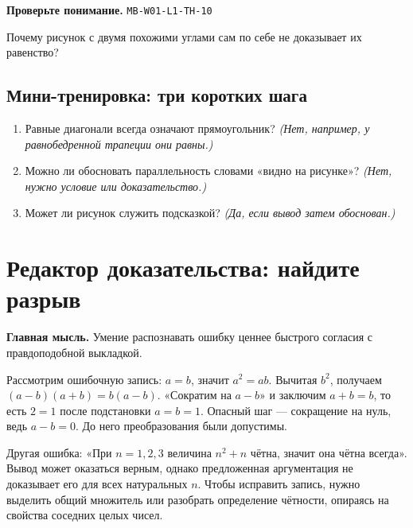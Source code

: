 \documentclass[11pt,a4paper,openany]{book}
\newcommand{\muid}[1]{\texttt{\footnotesize #1}}
\begin{document}
\begin{learnbox}\textbf{Проверьте понимание.} \muid{MB-W01-L1-TH-10}\par Почему рисунок с двумя похожими углами сам по себе не доказывает их равенство?\end{learnbox}

\subsection*{Мини-тренировка: три коротких шага}
\begin{enumerate}[label=\arabic*),leftmargin=*,itemsep=3pt]

\item Равные диагонали всегда означают прямоугольник? \textit{(Нет, например, у равнобедренной трапеции они равны.)}

\item Можно ли обосновать параллельность словами «видно на рисунке»? \textit{(Нет, нужно условие или доказательство.)}

\item Может ли рисунок служить подсказкой? \textit{(Да, если вывод затем обоснован.)}

\end{enumerate}

\medskip

\section{Редактор доказательства: найдите разрыв}\label{theory:11}

\begin{keybox}\textbf{Главная мысль.} Умение распознавать ошибку ценнее быстрого согласия с правдоподобной выкладкой.\end{keybox}

Рассмотрим ошибочную запись: $a=b$, значит $a^2=ab$. Вычитая $b^2$, получаем $(a-b)(a+b)=b(a-b)$. «Сократим на $a-b$» и заключим $a+b=b$, то есть $2=1$ после подстановки $a=b=1$. Опасный шаг — сокращение на нуль, ведь $a-b=0$. До него преобразования были допустимы.


Другая ошибка: «При $n=1,2,3$ величина $n^2+n$ чётна, значит она чётна всегда». Вывод может оказаться верным, однако предложенная аргументация не доказывает его для всех натуральных $n$. Чтобы исправить запись, нужно выделить общий множитель или разобрать определение чётности, опираясь на свойства соседних целых чисел.
\end{document}
